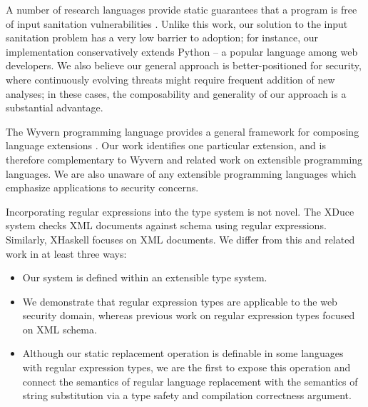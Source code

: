 \documentclass[9pt]{sig-alternate}
\theoremstyle{definition}
\begin{document}
A number of research languages provide static guarantees that a program is free of input sanitation vulnerabilities \cite{UrFlowOSDI10}. 
Unlike this work, our solution to the input sanitation problem has a very low barrier to adoption; for instance, our implementation conservatively extends Python -- a popular language among web developers.
We also believe our general approach is better-positioned for security, where continuously evolving threats might require frequent addition of new analyses; in these cases, the composability and generality of our approach is a substantial advantage.


The Wyvern programming language provides a general framework for composing language extensions \cite{tsl}\cite{wyvern}.
Our work identifies one particular extension, and is therefore complementary to Wyvern and related
work on extensible programming languages.
We are also unaware of any extensible programming languages which emphasize applications to security concerns.

Incorporating regular expressions into the type system is not novel. The XDuce system \cite{HosoyaVouillonPierce2000ICFP,HosoyaPierce2002} checks XML documents against schema using regular expressions. 
Similarly, XHaskell \cite{xhaskell} focuses on XML documents.
We differ from this and related work in at least three ways:
\begin{itemize}
  \item Our system is defined within an extensible type system.
  \item We demonstrate that regular expression types are applicable to the web security domain, whereas previous work on regular expression types focused on XML schema.
  \item Although our static replacement operation is definable in some languages with regular expression types, we are the first to expose this operation and connect the semantics of regular language replacement with the semantics of string substitution via a type safety and compilation correctness argument.
\end{itemize}
\end{document}
